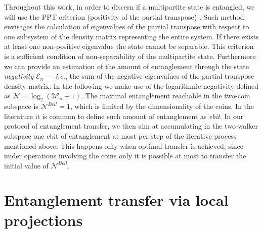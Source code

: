 \documentclass[
	aps, pra,
	superscriptaddress, twocolumn,
	floatfix,
	10pt
]{revtex4-1}
\newcommand{\parTitle}[1]{\noindent{\color{Mahogany}(\emph{#1})}}
\newcommand{\LI}[1]{\highlight{(LI: \textit{#1})}}
\renewcommand{\parTitle}[1]{}
\begin{document}
\parTitle{We use negativity to estimate entanglement}
\LI{Do we need this paragraph?}
Throughout this work, in order to discern if a multipartite state is entangled, we will use the PPT criterion (positivity of the partial transpose) \cite{HORODECKI19961}. Such method envisages the calculation of eigenvalues of the partial transpose with respect to one subsystem of the density matrix representing the entire system. If there exists at least one non-positive eigenvalue the state cannot be separable. This criterion is a sufficient condition of non-separability of the multipartite state. Furthermore we can provide an estimation of the amount of entanglement through the state \emph{negativity} $\mathcal{E}_n$ --- \emph{i.e.},  the sum of the negative eigenvalues of the partial transpose density matrix. In the following we make use of the logarithmic negativity defined as $\mathcal{N}=\log_2(2\mathcal{E}_n+1)$. The maximal entanglement reachable in the two-coin subspace is $\mathcal{N}^{Bell}=1$, which is limited by the dimensionality of the coins. In the literature it is common to define such amount of entanglement as \textit{ebit}. In our protocol of entanglement transfer, we then aim at accumulating in the two-walker subspace one ebit of entanglement at most per step of the iterative process mentioned above. This happens only when optimal transfer is achieved, since under operations involving the coins only it is possible at most to transfer the initial value of $\mathcal{N}^{Bell}$.


\section{Entanglement transfer via local projections}
\label{sec:entanglement_transfer_local_projections}
\end{document}
